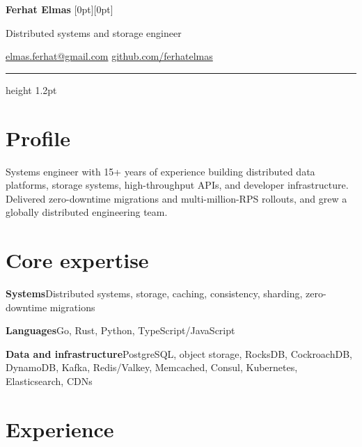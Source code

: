 \documentclass[11pt,a4paper]{article}
\begin{document}
\raggedright

{\fontsize{28}{30}\selectfont\bfseries\color{ink}Ferhat Elmas}%
\hfill
\raisebox{5pt}[0pt][0pt]{%
  {\footnotesize\color{muted}}%
}\par
{\large\color{accent}Distributed systems and storage engineer}\par
\vspace{3pt}
{\small\color{muted}
  \href{mailto:elmas.ferhat@gmail.com}{elmas.ferhat@gmail.com}
  \hspace{0.65em}\textcolor{rule}{\textbullet}\hspace{0.65em}
  \href{https://github.com/ferhatelmas}{github.com/ferhatelmas}
}\par

\vspace{5pt}
{\color{rule}\hrule height 1.2pt}

\section{Profile}
Systems engineer with 15+ years of experience building distributed data platforms, storage systems, high-throughput APIs, and developer infrastructure. Delivered zero-downtime migrations and multi-million-RPS rollouts, and grew a globally distributed engineering team.

\section{Core expertise}
{\bfseries\color{ink}Systems}\enspace Distributed systems, storage, caching, consistency, sharding, zero-downtime migrations\par
\vspace{2pt}
{\bfseries\color{ink}Languages}\enspace Go, Rust, Python, TypeScript/JavaScript\par
\vspace{2pt}
{\bfseries\color{ink}Data and infrastructure}\enspace PostgreSQL, object storage, RocksDB, CockroachDB, DynamoDB, Kafka, Redis/Valkey, Memcached, Consul, Kubernetes, Elasticsearch, CDNs\par

\section{Experience}
\end{document}
